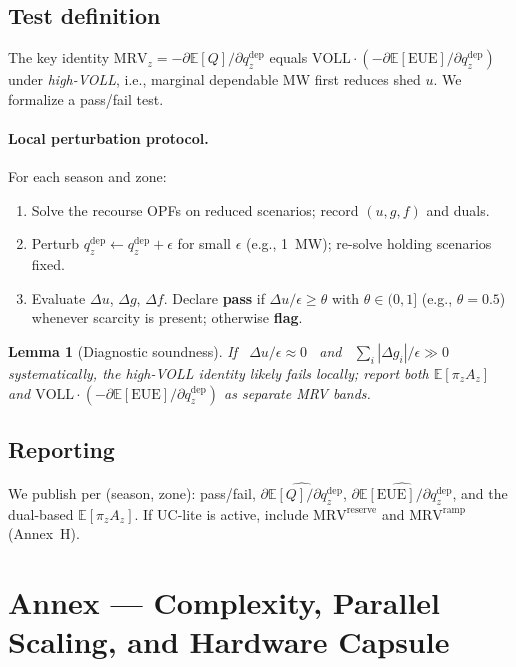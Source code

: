 \documentclass[11pt]{article}
\newcommand{\E}{\mathbb{E}}
\numberwithin{equation}{section}
\newtheorem{lemma}{Lemma}[section]
\theoremstyle{definition}
\theoremstyle{remark}
\begin{document}
\subsection{ Test definition}
The key identity $\mathrm{MRV}_z = -\partial \E[Q]/\partial q^{\mathrm{dep}}_{z}$ equals $\mathrm{VOLL}\cdot(-\partial \E[\mathrm{EUE}]/\partial q^{\mathrm{dep}}_{z})$ under \emph{high-VOLL}, i.e., marginal dependable MW first reduces shed $u$. We formalize a pass/fail test.

\paragraph{Local perturbation protocol.}
For each season and zone:
\begin{enumerate}[leftmargin=1.2em]
\item Solve the recourse OPFs on reduced scenarios; record $(u,g,f)$ and duals.
\item Perturb $q^{\mathrm{dep}}_{z}\leftarrow q^{\mathrm{dep}}_{z}+\epsilon$ for small $\epsilon$ (e.g., \SI{1}{MW}); re-solve holding scenarios fixed.
\item Evaluate $\Delta u$, $\Delta g$, $\Delta f$. Declare \textbf{pass} if $\Delta u/\epsilon \ge \theta$ with $\theta\in(0,1]$ (e.g., $\theta=0.5$) whenever scarcity is present; otherwise \textbf{flag}.
\end{enumerate}

\begin{lemma}[Diagnostic soundness]
If \ $\Delta u/\epsilon \approx 0$ \ and \ $\sum_i |\Delta g_i|/\epsilon\gg 0$ systematically, the high-VOLL identity likely fails locally; report both $\E[\pi_z A_z]$ and $\mathrm{VOLL}\cdot(-\partial \E[\mathrm{EUE}]/\partial q^{\mathrm{dep}}_{z})$ as \emph{separate} MRV bands.
\end{lemma}

\subsection{ Reporting}
We publish per (season, zone): pass/fail, $\widehat{\partial \E[Q] / \partial q^{\mathrm{dep}}_{z}}$, $\widehat{\partial \E[\mathrm{EUE}] / \partial q^{\mathrm{dep}}_{z}}$, and the dual-based $\E[\pi_z A_z]$. If UC-lite is active, include $\mathrm{MRV}^{\text{reserve}}$ and $\mathrm{MRV}^{\text{ramp}}$ (Annex~H).

\section{Annex — Complexity, Parallel Scaling, and Hardware Capsule}
\label{annex:N}
\end{document}
